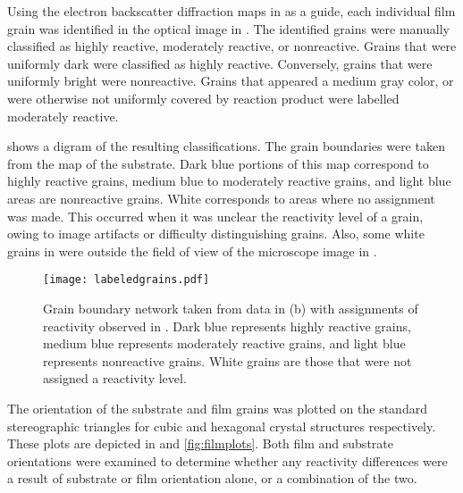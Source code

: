 Using the electron backscatter diffraction maps in  as a guide,
each individual film grain was identified in the optical image in .
The identified grains were manually classified as highly reactive, moderately reactive, or
nonreactive. Grains that were uniformly dark were classified as highly reactive.
Conversely, grains that were uniformly bright were nonreactive. Grains that appeared a
medium gray color, or were otherwise not uniformly covered by reaction product were
labelled moderately reactive.

 shows a digram of the resulting classifications. The grain
boundaries were taken from the  map of the substrate. Dark blue portions of
this map correspond to highly reactive grains, medium blue to moderately reactive grains,
and light blue areas are nonreactive grains. White corresponds to areas where no
assignment was made. This occurred when it was unclear the reactivity level of a grain,
owing to image artifacts or difficulty distinguishing grains. Also, some white grains in
 were outside the field of view of the microscope image in
.
\begin{figure}
	\texttt{[image: labeledgrains.pdf]}
		\caption[Reactivity assignments for film]{%
			Grain boundary network taken from  data in 
			(b) with assignments of reactivity
			observed in . Dark blue represents 
			highly reactive grains, medium blue represents moderately
			reactive grains, and light blue represents nonreactive 
			grains. White grains are those that were not assigned a 
			reactivity level.}
	\label{fig:labeledgrains}
\end{figure}

The orientation of the substrate and film grains was plotted on the standard stereographic
triangles for cubic and hexagonal crystal structures respectively. These plots are
depicted in  and \ref{fig:filmplots}. Both film and substrate
orientations were examined to determine whether any reactivity differences were a result
of substrate or film orientation alone, or a combination of the two.

